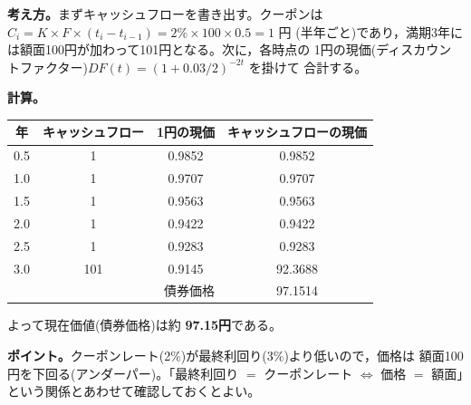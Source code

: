 \begin{answerbox}
\textbf{考え方。}まずキャッシュフローを書き出す。クーポンは
$C_i = K\times F\times(t_i - t_{i-1}) = 2\%\times 100\times 0.5 = 1$ 円
(半年ごと)であり，満期3年には額面100円が加わって101円となる。次に，各時点の
1円の現価(ディスカウントファクター)$DF(t) = (1+0.03/2)^{-2t}$ を掛けて
合計する。

\medskip
\textbf{計算。}
\vspace{0.9em}
\begin{center}
\begin{tabular}{cccc}
\toprule
年 & キャッシュフロー & 1円の現価 & キャッシュフローの現価\\
\midrule
0.5 & 1 & 0.9852 & 0.9852\\
1.0 & 1 & 0.9707 & 0.9707\\
1.5 & 1 & 0.9563 & 0.9563\\
2.0 & 1 & 0.9422 & 0.9422\\
2.5 & 1 & 0.9283 & 0.9283\\
3.0 & 101 & 0.9145 & 92.3688\\
\midrule
\multicolumn{3}{r}{債券価格} & 97.1514\\
\bottomrule
\end{tabular}
\end{center}
\vspace{0.9em}
よって現在価値(債券価格)は約 \textbf{97.15円}である。

\medskip
\textbf{ポイント。}クーポンレート(2\%)が最終利回り(3\%)より低いので，価格は
額面100円を下回る(アンダーパー)。「最終利回り $=$ クーポンレート $\iff$
価格 $=$ 額面」という関係とあわせて確認しておくとよい。
\end{answerbox}

